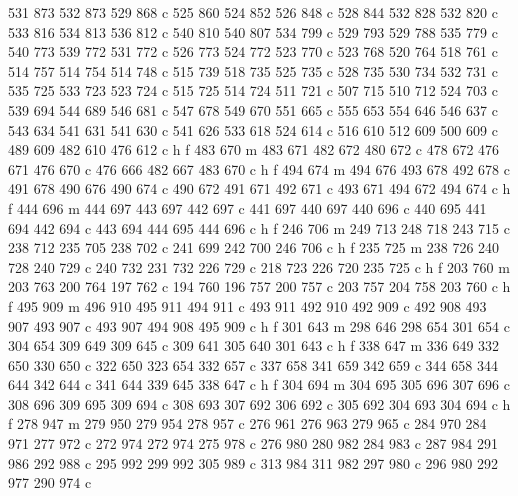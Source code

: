 {{        531 873 532 873 529 868 c
        525 860 524 852 526 848 c
        528 844 532 828 532 820 c
        533 816 534 813 536 812 c
        540 810 540 807 534 799 c
        529 793 529 788 535 779 c
        540 773 539 772 531 772 c
        526 773 524 772 523 770 c
        523 768 520 764 518 761 c
        514 757 514 754 514 748 c
        515 739 518 735 525 735 c
        528 735 530 734 532 731 c
        535 725 533 723 523 724 c
        515 725 514 724 511 721 c
        507 715 510 712 524 703 c
        539 694 544 689 546 681 c
        547 678 549 670 551 665 c
        555 653 554 646 546 637 c
        543 634 541 631 541 630 c
        541 626 533 618 524 614 c
        516 610 512 609 500 609 c
        489 609 482 610 476 612 c
        h f
        483 670 m
        483 671 482 672 480 672 c
        478 672 476 671 476 670 c
        476 666 482 667 483 670 c
        h f
        494 674 m
        494 676 493 678 492 678 c
        491 678 490 676 490 674 c
        490 672 491 671 492 671 c
        493 671 494 672 494 674 c
        h f
        444 696 m
        444 697 443 697 442 697 c
        441 697 440 697 440 696 c
        440 695 441 694 442 694 c
        443 694 444 695 444 696 c
        h f
        246 706 m
        249 713 248 718 243 715 c
        238 712 235 705 238 702 c
        241 699 242 700 246 706 c
        h f
        235 725 m
        238 726 240 728 240 729 c
        240 732 231 732 226 729 c
        218 723 226 720 235 725 c
        h f
        203 760 m
        203 763 200 764 197 762 c
        194 760 196 757 200 757 c
        203 757 204 758 203 760 c
        h f
        495 909 m
        496 910 495 911 494 911 c
        493 911 492 910 492 909 c
        492 908 493 907 493 907 c
        493 907 494 908 495 909 c
        h f
        301 643 m
        298 646 298 654 301 654 c
        304 654 309 649 309 645 c
        309 641 305 640 301 643 c
        h f
        338 647 m
        336 649 332 650 330 650 c
        322 650 323 654 332 657 c
        337 658 341 659 342 659 c
        344 658 344 644 342 644 c
        341 644 339 645 338 647 c
        h f
        304 694 m
        304 695 305 696 307 696 c
        308 696 309 695 309 694 c
        308 693 307 692 306 692 c
        305 692 304 693 304 694 c
        h f
        278 947 m
        279 950 279 954 278 957 c
        276 961 276 963 279 965 c
        284 970 284 971 277 972 c
        272 974 272 974 275 978 c
        276 980 280 982 284 983 c
        287 984 291 986 292 988 c
        295 992 299 992 305 989 c
        313 984 311 982 297 980 c
        296 980 292 977 290 974 c
}}
